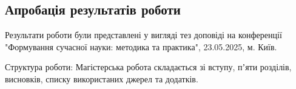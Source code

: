 \subsection*{Апробація результатів роботи}
Результати роботи були представлені у вигляді тез доповіді на конференції "Формування сучасної науки: методика та практика", 23.05.2025, м. Київ.

Структура роботи: Магістерська робота складається зі вступу, пʼяти розділів, висновків, списку використаних джерел та додатків. 
